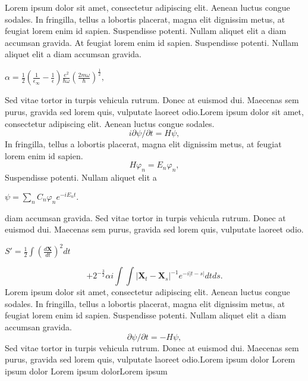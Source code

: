 \documentclass[a4paper, 9pt]{article}
\begin{document}
\begin{multicols}{2}
	Lorem ipsum dolor sit amet, consectetur adipiscing elit. Aenean luctus congue sodales. In fringilla, tellus a lobortis placerat, magna elit dignissim metus, at feugiat lorem enim id sapien. Suspendisse potenti. Nullam aliquet elit a diam accumsan gravida. At feugiat lorem enim id sapien. Suspendisse potenti. Nullam aliquet elit a diam accumsan gravida. \begin{center} $ \alpha=\frac{1}{2}(\frac{1}{\epsilon_\infty} - \frac{1}{\epsilon})\frac{e^2}{\hbar\omega}(\frac{2m\omega}{\hbar})^{\frac{1}{2}},$ \end{center} Sed vitae tortor in turpis vehicula rutrum. Donec at euismod dui. Maecenas sem purus, gravida sed lorem quis, vulputate laoreet odio.Lorem ipsum dolor sit amet, consectetur adipiscing elit. Aenean luctus congue sodales. \begin{equation}i\partial\psi/\partial t=H\psi, \end{equation}In fringilla, tellus a lobortis placerat, magna elit dignissim metus, at feugiat lorem enim id sapien.\\ \begin{equation}H\varphi_n=E_n\varphi_n,\end{equation} Suspendisse potenti. Nullam aliquet elit a
	\\ \begin{center}$\psi=\sum _n C_n \varphi_ne^{-iE_nt}.$\end{center} diam accumsan gravida. Sed vitae tortor in turpis vehicula rutrum. Donec at euismod dui. Maecenas sem purus, gravida sed lorem quis, vulputate laoreet odio.\\ \begin{flushleft}$S'=\frac{1}{2}\int(\frac{d\textbf{X}}{dt})^2dt$\end{flushleft}
	\begin{equation}+2^{-\frac{3}{2}}\alpha i\int\int|\textbf{X}_t - \textbf{X}_s|^{-1}e^{-i|t-s|}dtds.\end{equation}
	Lorem ipsum dolor sit amet, consectetur adipiscing elit. Aenean luctus congue sodales. In fringilla, tellus a lobortis placerat, magna elit dignissim metus, at feugiat lorem enim id sapien. Suspendisse potenti. Nullam aliquet elit a diam accumsan gravida.\begin{equation}\partial\psi/\partial t = -H\psi,\end{equation} Sed vitae tortor in turpis vehicula rutrum. Donec at euismod dui. Maecenas sem purus, gravida sed lorem quis, vulputate laoreet odio.Lorem ipsum dolor Lorem ipsum dolor Lorem ipsum dolorLorem ipsum
\end{multicols}
\end{document}
